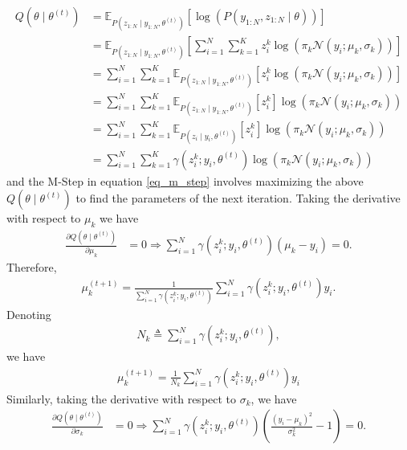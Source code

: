 \documentclass[10pt ]{article}
\begin{document}
\begin{align}
Q(\theta \mid \theta^{(t)}) &= \mathbb{E}_{P(z_{1:N} \mid y_{1:N}, \theta^{(t)})} \left[ \log \left( P(y_{1:N}, z_{1:N} \mid \theta)\right)\right] \nonumber \\
&= \mathbb{E}_{P(z_{1:N} \mid y_{1:N}, \theta^{(t)})} \left[ \sum_{i=1}^N  \sum_{k=1}^K z^k_i \log \left( \pi_k \mathcal{N}(y_{i} ; \mu_k, \sigma_k) \right) \right] \nonumber \\
&= \sum_{i=1}^N  \sum_{k=1}^K \mathbb{E}_{P(z_{1:N} \mid y_{1:N}, \theta^{(t)})} \left[z^k_i \log \left( \pi_k \mathcal{N}(y_{i} ; \mu_k, \sigma_k) \right) \right] \nonumber \\
&= \sum_{i=1}^N  \sum_{k=1}^K \mathbb{E}_{P(z_{1:N} \mid y_{1:N}, \theta^{(t)})} \left[z^k_i \right] \log \left( \pi_k \mathcal{N}(y_{i} ; \mu_k, \sigma_k) \right)  \nonumber \\
&= \sum_{i=1}^N  \sum_{k=1}^K \mathbb{E}_{P(z_{i} \mid y_{i}, \theta^{(t)})} \left[z^k_i \right] \log \left( \pi_k \mathcal{N}(y_{i} ; \mu_k, \sigma_k) \right)  \nonumber \\
&= \sum_{i=1}^N \sum_{k=1}^K \gamma(z^k_i; y_i, \theta^{(t)} )  \log \left( \pi_k \mathcal{N}(y_i ; \mu_k, \sigma_k) \right)
\end{align}
and the M-Step in equation \eqref{eq_m_step} involves maximizing the above $Q(\theta \mid \theta^{(t)}) $ to find the parameters of the next iteration. Taking the derivative with respect to $\mu_k$ we have 
\begin{align}
\frac{\partial Q(\theta \mid \theta^{(t)})}{\partial \mu_k} &= 0 \Rightarrow  \sum_{i=1}^N  \gamma(z^k_i; y_i, \theta^{(t)} )   \left( \mu_k - y_i  \right) = 0. \nonumber
\end{align}
Therefore,
\begin{align}
\mu_k^{(t+1)} = \frac{1}{\sum_{i=1}^N  \gamma(z^k_i; y_i, \theta^{(t)}) } \sum_{i=1}^N  \gamma(z^k_i; y_i, \theta^{(t)})  y_i. 
\end{align}
Denoting 
\begin{align}
N_k \triangleq \sum_{i=1}^N  \gamma(z^k_i; y_i, \theta^{(t)}) ,
\label{eq_def_nk}
\end{align}
we have 
\begin{align}
\mu_k^{(t+1)} = \frac{1}{N_k } \sum_{i=1}^N  \gamma(z^k_i; y_i, \theta^{(t)})  y_i
\label{eq_update_mu}
\end{align}
Similarly, taking the derivative with respect to $\sigma_k$, we have 
\begin{align}
\frac{\partial Q(\theta \mid \theta^{(t)})}{\partial \sigma_k} &= 0 \Rightarrow  \sum_{i=1}^N  \gamma(z^k_i; y_i, \theta^{(t)} )   \left( \frac{(y_i - \mu_k)^2}{\sigma_k^2} - 1  \right) = 0. \nonumber
\end{align}
\end{document}
